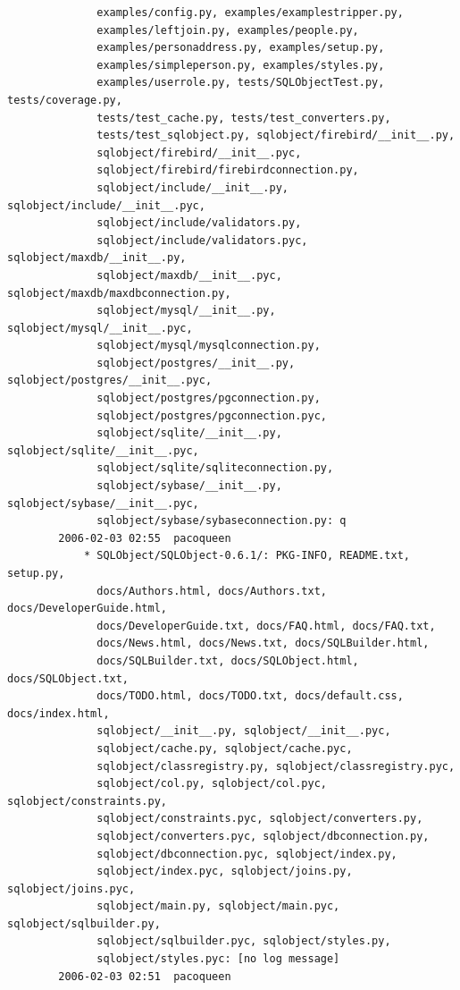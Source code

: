 \documentclass[a4paper]{article}
\begin{document}
\begin{verbatim}
              examples/config.py, examples/examplestripper.py,
              examples/leftjoin.py, examples/people.py,
              examples/personaddress.py, examples/setup.py,
              examples/simpleperson.py, examples/styles.py,
              examples/userrole.py, tests/SQLObjectTest.py, tests/coverage.py,
              tests/test_cache.py, tests/test_converters.py,
              tests/test_sqlobject.py, sqlobject/firebird/__init__.py,
              sqlobject/firebird/__init__.pyc,
              sqlobject/firebird/firebirdconnection.py,
              sqlobject/include/__init__.py, sqlobject/include/__init__.pyc,
              sqlobject/include/validators.py,
              sqlobject/include/validators.pyc, sqlobject/maxdb/__init__.py,
              sqlobject/maxdb/__init__.pyc, sqlobject/maxdb/maxdbconnection.py,
              sqlobject/mysql/__init__.py, sqlobject/mysql/__init__.pyc,
              sqlobject/mysql/mysqlconnection.py,
              sqlobject/postgres/__init__.py, sqlobject/postgres/__init__.pyc,
              sqlobject/postgres/pgconnection.py,
              sqlobject/postgres/pgconnection.pyc,
              sqlobject/sqlite/__init__.py, sqlobject/sqlite/__init__.pyc,
              sqlobject/sqlite/sqliteconnection.py,
              sqlobject/sybase/__init__.py, sqlobject/sybase/__init__.pyc,
              sqlobject/sybase/sybaseconnection.py: q
        2006-02-03 02:55  pacoqueen
            * SQLObject/SQLObject-0.6.1/: PKG-INFO, README.txt, setup.py,
              docs/Authors.html, docs/Authors.txt, docs/DeveloperGuide.html,
              docs/DeveloperGuide.txt, docs/FAQ.html, docs/FAQ.txt,
              docs/News.html, docs/News.txt, docs/SQLBuilder.html,
              docs/SQLBuilder.txt, docs/SQLObject.html, docs/SQLObject.txt,
              docs/TODO.html, docs/TODO.txt, docs/default.css, docs/index.html,
              sqlobject/__init__.py, sqlobject/__init__.pyc,
              sqlobject/cache.py, sqlobject/cache.pyc,
              sqlobject/classregistry.py, sqlobject/classregistry.pyc,
              sqlobject/col.py, sqlobject/col.pyc, sqlobject/constraints.py,
              sqlobject/constraints.pyc, sqlobject/converters.py,
              sqlobject/converters.pyc, sqlobject/dbconnection.py,
              sqlobject/dbconnection.pyc, sqlobject/index.py,
              sqlobject/index.pyc, sqlobject/joins.py, sqlobject/joins.pyc,
              sqlobject/main.py, sqlobject/main.pyc, sqlobject/sqlbuilder.py,
              sqlobject/sqlbuilder.pyc, sqlobject/styles.py,
              sqlobject/styles.pyc: [no log message]
        2006-02-03 02:51  pacoqueen

\end{verbatim}
\end{document}

